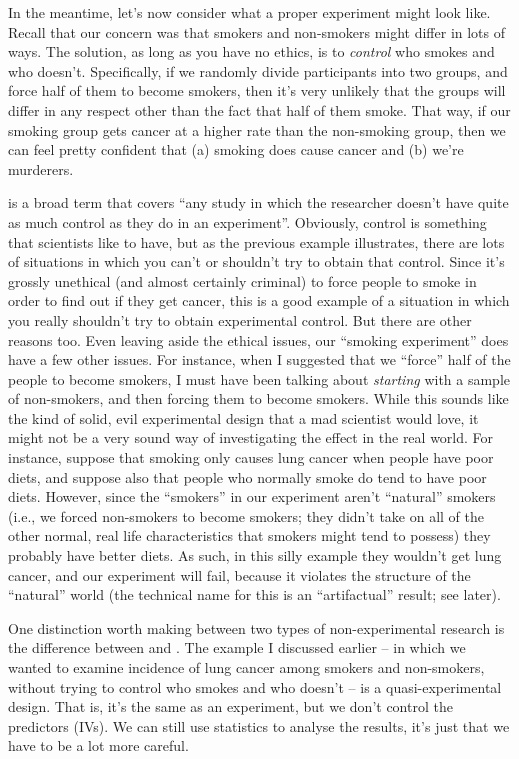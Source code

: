 In the meantime, let's now consider what a proper experiment might look like. Recall that our concern was that smokers and non-smokers might differ in lots of ways. The solution, as long as you have no ethics, is to {\it control} who smokes and who doesn't. Specifically, if we randomly divide participants into two groups, and force half of them to become smokers, then it's very unlikely that the groups will differ in any respect other than the fact that half of them smoke. That way, if our smoking group gets cancer at a higher rate than the non-smoking group, then we can feel pretty confident that (a) smoking does cause cancer and (b) we're murderers. 


 is a broad term that covers ``any study in which the researcher doesn't have quite as much control as they do in an experiment''. Obviously, control is something that scientists like to have, but as the previous example illustrates, there are lots of situations in which you can't or shouldn't try to obtain that control. Since it's  grossly unethical (and almost certainly criminal) to force people to smoke in order to find out if they get cancer, this is a good example of a situation in which you really shouldn't try to obtain experimental control. But there are other reasons too. Even leaving aside the ethical issues, our ``smoking experiment'' does have a few other issues. For instance, when I suggested that we ``force'' half of the people to become smokers, I must have been talking about {\it starting} with a sample of non-smokers, and then forcing them to become smokers. While this sounds like the kind of solid, evil experimental design that a mad scientist would love, it might not be a very sound way of investigating the effect in the real world. For instance, suppose that smoking only causes lung cancer when people have poor diets, and suppose also that people who normally smoke do tend to have poor diets. However, since the ``smokers'' in our experiment aren't ``natural'' smokers (i.e., we forced non-smokers to become smokers; they didn't take on all of the other normal, real life characteristics that smokers might tend to possess) they probably have better diets. As such, in this silly example they wouldn't get lung cancer, and our experiment will fail, because it violates the structure of the ``natural'' world (the technical name for this is an ``artifactual'' result; see later).

One distinction worth making between two types of non-experimental research is the difference between  and . The example I discussed earlier -- in which we wanted to examine incidence of lung cancer among smokers and non-smokers, without trying to control who smokes and who doesn't -- is a quasi-experimental design. That is, it's the same as an experiment, but we don't control the predictors (IVs). We can still use statistics to analyse the results, it's just that we have to be a lot more careful.

